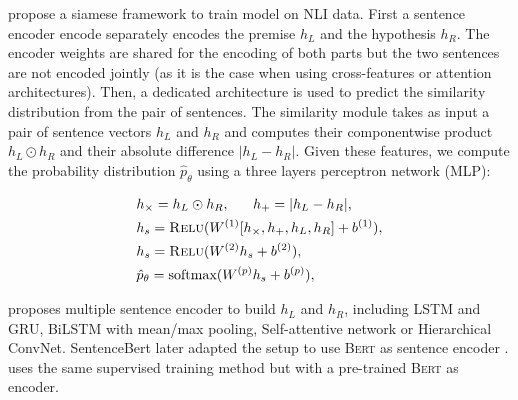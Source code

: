 \textcite{conneau_17} propose a siamese framework to train model on NLI data. First a sentence encoder encode separately encodes the premise $h_L$ and the hypothesis $h_R$. The encoder weights are shared for the encoding of both parts but the two sentences are not encoded jointly (as it is the case when using cross-features or attention architectures). Then, a dedicated architecture is used to predict the similarity distribution from the pair of sentences. The similarity module takes as input a pair of sentence vectors $h_{L} $ and $h_{R}$ and computes their component\-wise product $h_{L} \odot h_{R}$ and their absolute difference $|h_{L} - h_{R}|$. Given these features, we compute the probability distribution  $\hat{p}_{\theta}$ using a three layers perceptron network (MLP):

\begin{align}
\begin{split}
&h_{\times}=h_L\odot h_R, ~~~~~h_{+} = |h_L - h_R |, \\
&h_s = \textsc{Relu}(W^{(1)}[h_{\times}, h_{+}, h_L, h_R] + b^{(1)}), \\
&h_s = \textsc{Relu}(W^{(2)}h_s + b^{(2)}), \\
&\hat{p}_{\theta} = \text{softmax}(W^{(p)}h_s + b^{(p)}),\\
\end{split}
\end{align}


\textcite{conneau_17} proposes multiple sentence encoder to build $h_{L} $ and $h_{R}$, including LSTM and GRU, BiLSTM with mean/max pooling, Self-attentive network or Hierarchical ConvNet. SentenceBert later adapted the setup to use \textsc{Bert} as sentence encoder \parencite{reimers_19}. \textcite{reimers_19} uses the same supervised training method but with a pre-trained \textsc{Bert} as encoder.


